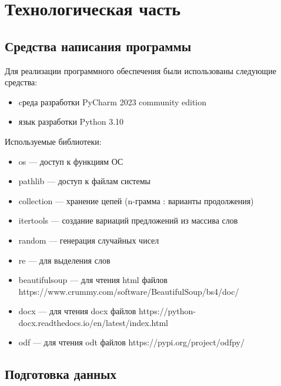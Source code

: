 \chapter{Технологическая часть}

\section{Средства написания программы}
Для реализации программного обеспечения были использованы следующие средства:

\begin{itemize}
    \item cреда разработки PyCharm 2023 community edition \cite{lib:pycharm}
    \item язык разработки Python 3.10 \cite{lib:python}
\end{itemize}
	
Используемые библиотеки:
\begin{itemize}
    \item os — доступ к функциям ОС \cite{lib:os}
    \item pathlib — доступ к файлам системы \cite{lib:pathlib}
    \item collection — хранение цепей (n-грамма : варианты продолжения) \cite{lib:collections}
    \item itertools — создание вариаций предложений из массива слов \cite{lib:itertools}
    \item random — генерация случайных чисел \cite{lib:random}
    \item re — для выделения слов \cite{lib:re}
    \item beautifulsoup — для чтения html файлов \cite{lib:bs4} https://www.crummy.com/software/BeautifulSoup/bs4/doc/
    \item docx — для чтения docx файлов \cite{lib:docx} https://python-docx.readthedocs.io/en/latest/index.html
    \item odf — для чтения odt файлов \cite{lib:odf} https://pypi.org/project/odfpy/
\end{itemize}

\section{Подготовка данных}

